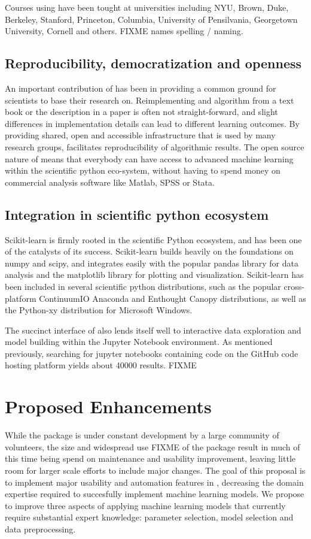 Courses using \sklearn{} have been tought at universities
including NYU, Brown, Duke, Berkeley, Stanford, Princeton,
Columbia, University of Pensilvania, Georgetown University, Cornell
and others. FIXME names spelling / naming.


\subsection{Reproducibility, democratization and openness}
An important contribution of \sklearn{} has been in providing a common
ground for scientists to base their research on. Reimplementing
and algorithm from a text book or the description in a paper is often not
straight-forward, and slight differences in implementation details can
lead to different learning outcomes. By providing shared, open and 
accessible infrastructure that is used by many research groups,
\sklearn{} facilitates reproducibility of algorithmic results.
The open source nature of \sklearn{} means that everybody can have access
to advanced machine learning within the scientific python eco-system,
without having to spend money on commercial analysis software like Matlab,
SPSS or Stata.

\subsection{Integration in scientific python ecosystem}
Scikit-learn is firmly rooted in the scientific Python ecosystem, and has been
one of the catalysts of its success. Scikit-learn builds heavily on the
foundations on numpy and scipy, and integrates easily with the popular pandas
library for data analysis and the matplotlib library for plotting and
visualization.
Scikit-learn has been included in several scientific python distributions, such
as the popular cross-platform ContinuumIO Anaconda and Enthought Canopy
distributions, as well as the Python-xy distribution for Microsoft Windows.

The succinct interface of \sklearn{} also lends itself well to interactive
data exploration and model building within the Jupyter Notebook environment.
As mentioned previously, searching for jupyter notebooks containing
\sklearn{} code on the GitHub code hosting platform yields about 40000
results. FIXME

\section{Proposed Enhancements}
While the \sklearn{} package is under constant development by a large community
of volunteers, the size and widespread use FIXME of the package result in much of this
time being spend on maintenance and usability improvement, leaving little room
for larger scale efforts to include major changes. The goal of this proposal
is to implement major usability and automation features in \sklearn{}, decreasing
the domain expertise required to succesfully implement machine learning models.
We propose to improve three aspects of applying machine learning models that
currently require substantial expert knowledge: parameter selection, model
selection and data preprocessing.

